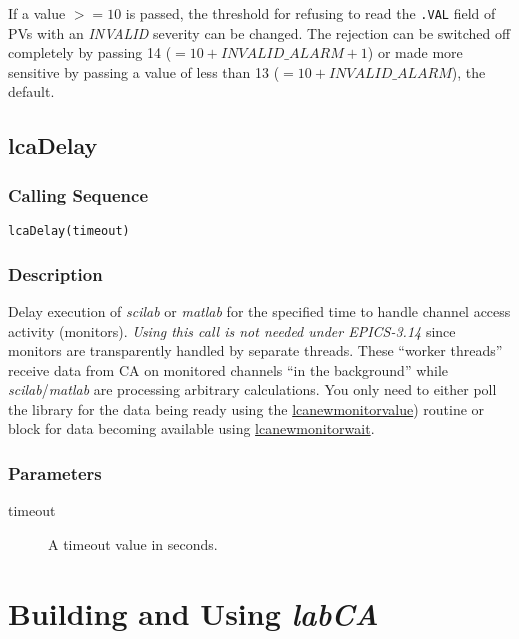 \documentclass{article}
\newcommand{\sca}{\ita{labCA}}
\newcommand{\scilab}{\ita{scilab}}
\newcommand{\matlab}{\ita{matlab}}
\newcommand{\com}[1]{{\tt #1}}
\newcommand{\pbrk}{\pagebreak[3]}
\newcommand{\pbrkf}{\pagebreak}
\newcommand{\comref}[2]{\hyperref{\com{#1}}{\com{#1} (see }{)}{#2}}
\newcommand{\ita}[1]{\emph{#1}}
\renewcommand{\pbrk}{}
\renewcommand{\pbrkf}{}
\begin{document}
If a value $>=10$ is passed, the threshold for refusing to read the \com{.VAL}
field of PVs with an \ita{INVALID} severity can be changed. The rejection
can be switched off completely by passing 14 ($= 10 + INVALID\_ALARM + 1$)
or made more sensitive by passing a value of less than 13 ($=10 + INVALID\_ALARM$),
the default.

\vspace*{\fill}
\pbrk
\subsection{lcaDelay}
\label{lcadelay}
\subsubsection{Calling Sequence}
\begin{verbatim}
lcaDelay(timeout)
\end{verbatim}
\subsubsection{Description}
Delay execution of \scilab{} or \matlab{} for the specified time
to handle channel access activity (monitors). 
{\em Using this call is not needed under EPICS-3.14} since monitors
are transparently handled by separate threads. These ``worker threads''
receive data from CA on monitored channels ``in the background'' while
\scilab{}/\matlab{} are processing arbitrary calculations.
You only need to either poll the library for the data being ready using the
\comref{lcaNewMonitorValue()}{lcanewmonitorvalue}) routine
or block for data becoming available using
\comref{lcaNewMonitorWait}{lcanewmonitorwait}.

\subsubsection{Parameters}
\begin{description}
\item[timeout]
A timeout value in seconds.
\end{description}

\pbrkf
\section{Building and Using \sca{}}
\end{document}
